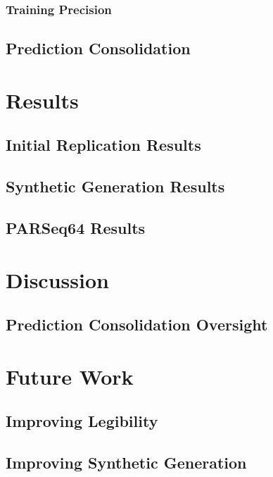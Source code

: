 \documentclass[11pt, letterpaper]{article}
\begin{document}
\subsubsection{Training Precision}

\subsection{Prediction Consolidation}

\section{Results}

\subsection{Initial Replication Results}

\subsection{Synthetic Generation Results}

\subsection{PARSeq64 Results}

\section{Discussion}

\subsection{Prediction Consolidation Oversight}

\section{Future Work}

\subsection{Improving Legibility}

\subsection{Improving Synthetic Generation}


\clearpage


\end{document}
